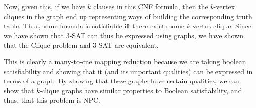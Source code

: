 \documentclass[a4paper]{article}
\begin{document}
Now, given this, if we have $k$ clauses in this CNF formula, then the $k$-vertex cliques in the graph end up representing ways of building the corresponding truth table. Thus, some formula is satisfiable iff there exists some $k$-vertex clique. Since we have shown that 3-SAT can thus be expressed using graphs, we have shown that the Clique problem and 3-SAT are equivalent.

This is clearly a many-to-one mapping reduction because we are taking boolean satisfiability and showing that it (and its important qualities) can be expressed in terms of a graph. By showing that these graphs have certain qualities, we can show that $k$-clique graphs have similar properties to Boolean satisfiability, and thus, that this problem is NPC.
\end{document}
